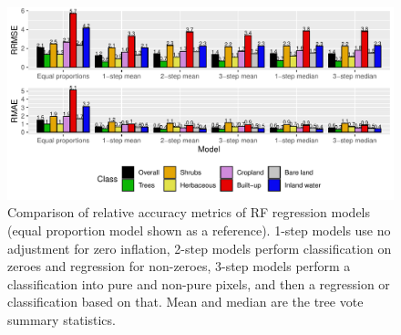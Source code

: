 \documentclass[authoryear,3p]{elsarticle}
\begin{document}
\begin{figure}
    \centering
    \includegraphics[width=\textwidth]{article-figures/barplots/2020-11-02-rf-comparison-bar}
    \caption{Comparison of relative accuracy metrics of RF regression models (equal proportion model shown as a reference). 1-step models use no adjustment for zero inflation, 2-step models perform classification on zeroes and regression for non-zeroes, 3-step models perform a classification into pure and non-pure pixels, and then a regression or classification based on that. Mean and median are the tree vote summary statistics.}
    \label{fig-randomforest}
\end{figure}


\end{document}
